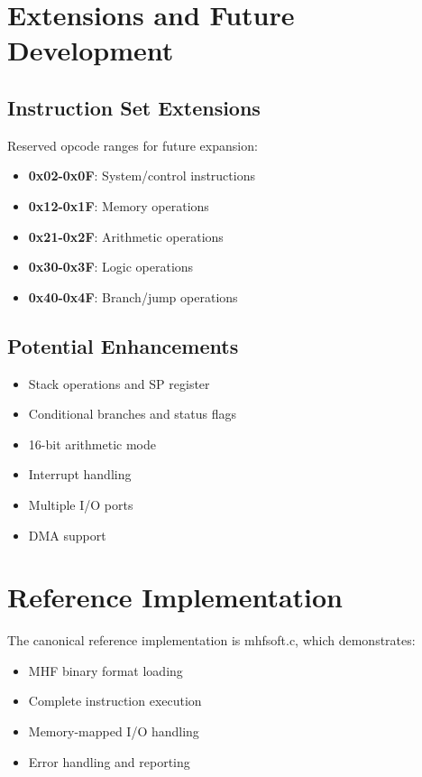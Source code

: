\documentclass[a4paper,12pt]{article}
\begin{document}
\section{Extensions and Future Development}

\subsection{Instruction Set Extensions}
Reserved opcode ranges for future expansion:
\begin{itemize}
    \item \textbf{0x02-0x0F}: System/control instructions
    \item \textbf{0x12-0x1F}: Memory operations
    \item \textbf{0x21-0x2F}: Arithmetic operations
    \item \textbf{0x30-0x3F}: Logic operations
    \item \textbf{0x40-0x4F}: Branch/jump operations
\end{itemize}

\subsection{Potential Enhancements}
\begin{itemize}
    \item Stack operations and SP register
    \item Conditional branches and status flags
    \item 16-bit arithmetic mode
    \item Interrupt handling
    \item Multiple I/O ports
    \item DMA support
\end{itemize}

\section{Reference Implementation}

The canonical reference implementation is mhfsoft.c, which demonstrates:
\begin{itemize}
    \item MHF binary format loading
    \item Complete instruction execution
    \item Memory-mapped I/O handling
    \item Error handling and reporting
\end{itemize}
\end{document}
